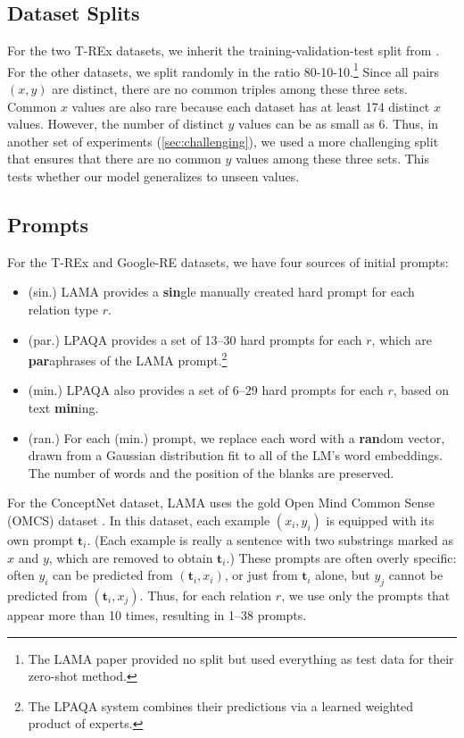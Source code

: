 \subsection{Dataset Splits}\label{sec:splits}

For the two T-REx datasets, we inherit the training-validation-test split from \citet{shinAutoPromptElicitingKnowledge2020}.  For the other datasets, we split randomly in the ratio 80-10-10.\footnote{The LAMA paper \citep{petroniLanguageModelsKnowledge2019} provided no split but used everything as test data for their zero-shot method.}  Since all pairs $(x,y)$ are distinct, there are no common triples among these three sets.  Common $x$ values are also rare because each dataset has at least 174 distinct $x$ values.  However, the number of distinct $y$ values can be as small as 6.  Thus, in another set of experiments (\ref{sec:challenging}), we used a more challenging split that ensures that there are no common $y$ values among these three sets.  This tests whether our model generalizes to unseen values.

\subsection{Prompts} 

For the T-REx and Google-RE datasets, we have four sources of initial prompts:

\begin{itemize}
    \item (sin.) LAMA provides a \textbf{sin}gle manually created hard prompt for each relation type $r$.
    \item (par.) LPAQA \citep{jiangHowCanWe2020} provides a set of 13--30 hard prompts for each $r$, which are \textbf{par}aphrases of the LAMA prompt.\footnote{The LPAQA system combines their predictions via a learned weighted product of experts.}
    \item (min.) LPAQA also provides a set of 6--29 hard prompts for each $r$, based on text \textbf{min}ing.
    \item (ran.) For each (min.) prompt, we replace each word with a \textbf{ran}dom vector, drawn from a Gaussian distribution fit to all of the LM's word embeddings.  The number of words and the position of the blanks are preserved.
\end{itemize}

For the ConceptNet dataset, LAMA uses the gold Open Mind Common Sense (OMCS) dataset \citep{singhOpenMindCommon2002}.  In this dataset, each example $(x_i,y_i)$ is equipped with its own prompt $\mathbf{t}_i$.  (Each example is really a sentence with two substrings marked as $x$ and $y$, which are removed to obtain $\mathbf{t}_i$.)  These prompts are often overly specific: often $y_i$ can be predicted from $(\mathbf{t}_i,x_i)$, or just from $\mathbf{t}_i$ alone, but $y_j$ cannot be predicted from $(\mathbf{t}_i,x_j)$.  Thus, for each relation $r$, we use only the prompts that appear more than 10 times, resulting in 1--38 prompts.    

